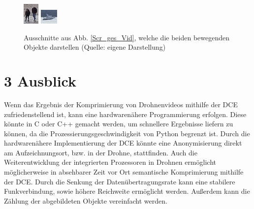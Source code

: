 \documentclass[a4paper,11pt,pdftex, parskip]{scrreprt}
\begin{document}
\begin{figure}[ht]
    \centering
    \includegraphics[scale = 4, keepaspectratio] {images/detail_screenshot_people.png}
    \includegraphics[scale = 4, keepaspectratio]{images/detail_screenshot_boat.png}
    \caption[Ausschnitte aus Abb. \ref{Scr_ges_Vid}, welche die beiden bewegenden Objekte darstellen ]{Ausschnitte aus Abb. \ref{Scr_ges_Vid}, welche die beiden bewegenden Objekte darstellen (Quelle: eigene Darstellung)}
    \label{Scr_detail_Obj}
\end{figure}


    
    






\section*{3 Ausblick}
Wenn das Ergebnis der Komprimierung von Drohnenvideos mithilfe der DCE zufriedenstellend ist, kann eine hardwarenähere Programmierung erfolgen. Diese könnte in C oder C++ gemacht werden, um schnellere Ergebnisse liefern zu können, da die Prozessierungsgeschwindigkeit von Python begrenzt ist.\newline
Durch die hardwarenähere Implementierung der DCE könnte eine Anonymisierung direkt am Aufzeichnungsort, bzw. in der Drohne, stattfinden. 
Auch die Weiterentwicklung der integrierten Prozessoren in Drohnen ermöglicht möglicherweise in absehbarer Zeit vor Ort semantische Komprimierung mithilfe der DCE. Durch die Senkung der Datenübertragungsrate kann eine stabilere Funkverbindung, sowie höhere Reichweite ermöglicht werden. Außerdem kann die Zählung der abgebildeten Objekte vereinfacht werden.
\end{document}
